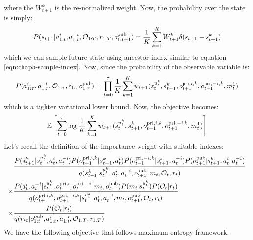 where the $W^k_{t+1}$ is the re-normalized weight. Now, the probability over the state is simply:
\begin{equation}
    P(s_{t+1} | a^{i}_{1:t}, a^{-i}_{1:t}, \mathcal{O}_{1:T}, r_{1:T}, o^{\operatorname{pub}}_{1:t+1}) = \frac{1}{K}\sum^K_{k=1} W^k_{t+1} \delta (s_{t+1} - s_{t+1}^k)
\end{equation}
which we can sample future state using ancestor index similar to equation \ref{eqn:chap5-sample-index}. Now, since the probability of the observable variable is:
\begin{equation}
    P(a^{i}_{1:\tau}, a^{-i}_{1:\tau}, \mathcal{O}_{1:\tau}, r_{1:\tau} o^{\operatorname{pub}}_{1:\tau}) = \prod^\tau_{t=0}\frac{1}{K}\sum^K_{k=1} w_{t+1}(s_t^{u^k_t}, s_{t+1}^k, o^{\operatorname{pri}, i, k}_{t+1}, o^{\operatorname{pri}, -i, k}_{t+1}, m_t^1)
\end{equation}
which is a tighter variational lower bound. Now, the objective becomes:
\begin{equation}
    \mathbb{E}\left[ \sum^\tau_{t=0} \log \frac{1}{K} \sum ^K_{k=1} w_{t+1}(s_t^{u^k_t}, s_{t+1}^k, o^{\operatorname{pri}, i, k}_{t+1}, o^{\operatorname{pri}, -i, k}_{t+1}, m_t^1) \right]
\end{equation}
Let's recall the definition of the importance weight with suitable indexes:
\begin{equation}
\begin{aligned}
    &\frac{P(s_{t+1}^k | s_t^{u^k_t}, a_t^i, a_t^{-i})P(o^{\operatorname{pri}, i, k}_{t+1} | s_{t+1}^k, a^i_t) P(o^{\operatorname{pri}, -i, k}_{t+1} | s_{t+1}^k, a^{-i}_t) P(o^{\operatorname{pub}}_{t+1} | s_{t+1}^k, a^i_t, a^{-i}_t)}{q(s_{t+1}^k | s_t^{u^k_t}, a^i_t, a^{-i}_t, o^{\operatorname{pub}}_{t+1}, m_t, \mathcal{O}_t, r_t)} \\
    \times&\frac{P(a^i_t, a^{-i}_t | s_t^{u^k_t}, o^{\operatorname{pri}, i}_t, o^{\operatorname{pri}, -i}_t, m_t, o^{\operatorname{pub}}_t) P(m_t | s_t^{u^k_t}) P(\mathcal{O}_t | r_t)}{q(o^{\operatorname{pri}, i, k}_{t+1}, o^{\operatorname{pri}, -i, k}_{t+1} | s_t^{u^k_t}, a^i_t, a^{-i}_t, m_t, o^{\operatorname{pub}}_{t+1}, \mathcal{O}_t, r_t)} \\
    \times&\frac{P(\mathcal{O}_t | r_t)}{q(m_t | o^{\operatorname{pub}}_{1:t}, a^{i}_{1:t}, a^{-i}_{1:t}, \mathcal{O}_{1:T}, r_{1:T})}
\end{aligned}
\end{equation}
We have the following objective that follows maximum entropy framework:
